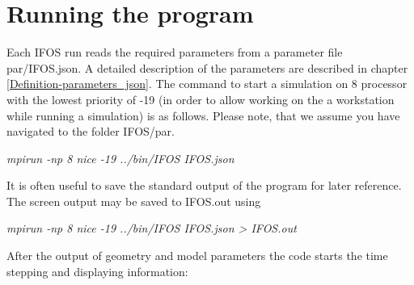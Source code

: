 \section{Running the program}\label{compexec1} 
Each IFOS run reads the required parameters from a parameter file par/IFOS.json. A detailed description of the parameters are described in chapter \ref{Definition-parameters_json}. 
The command to start a simulation on 8 processor with the lowest priority of -19 (in order to allow working on the a workstation while running a simulation) is as follows. Please note, that we assume you have navigated to the folder IFOS/par.
\newline

\textit{mpirun -np 8 nice -19 ../bin/IFOS IFOS.json }
\newline

It is often useful to save the standard output of the program for later reference. The screen output may be saved to IFOS.out using
\newline

\textit{mpirun -np 8 nice -19 ../bin/IFOS IFOS.json > IFOS.out}
\newline


After the output of geometry and model parameters the code starts the time stepping and displaying information:


